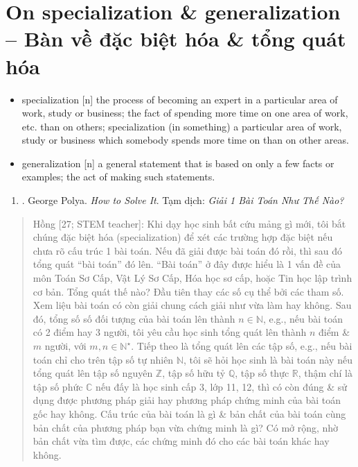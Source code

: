 \documentclass[12pt,twoside]{book}
\begin{document}
\section{On specialization \& generalization -- Bàn về đặc biệt hóa \& tổng quát hóa}

\begin{itemize}\small
	\item {\sf specialization} [n] the process of becoming an expert in a particular area of work, study or business; the fact of spending more time on one area of work, etc. than on others; specialization (in something) a particular area of work, study or business which somebody spends more time on than on other areas.
	\item {\sf generalization} [n] a general statement that is based on only a few facts or examples; the act of making such statements.
\end{itemize}

\begin{enumerate}
	\item \cite{Polya2014}. George Polya. {\it How to Solve It}. {\sf Tạm dịch}: {\it Giải 1 Bài Toán Như Thế Nào?}
\end{enumerate}

\begin{quote}
	{\sf Hồng [27; STEM teacher]}: Khi dạy học sinh bất cứu mảng gì mới, tôi bắt chúng đặc biệt hóa (specialization) để xét các trường hợp đặc biệt nếu chưa rõ cấu trúc 1 bài toán. Nếu đã giải được bài toán đó rồi, thì sau đó tổng quát ``bài toán'' đó lên. ``Bài toán'' ở đây được hiểu là 1 vấn đề của môn Toán Sơ Cấp, Vật Lý Sơ Cấp, Hóa học sơ cấp, hoặc Tin học lập trình cơ bản. Tổng quát thế nào? Đầu tiên thay các số cụ thể bởi các tham số. Xem liệu bài toán có còn giải chung cách giải như vừa làm hay không. Sau đó, tổng số số đối tượng của bài toán lên thành $n\in\mathbb{N}$, e.g., nếu bài toán có 2 điểm hay 3 người, tôi yêu cầu học sinh tổng quát lên thành $n$ điểm \& $m$ người, với $m,n\in\mathbb{N}^\star$. Tiếp theo là tổng quát lên các tập số, e.g., nếu bài toán chỉ cho trên tập số tự nhiên $\mathbb{N}$, tôi sẽ hỏi học sinh là bài toán này nếu tổng quát lên tập số nguyên $\mathbb{Z}$, tập số hữu tỷ $\mathbb{Q}$, tập số thực $\mathbb{R}$, thậm chí là tập số phức $\mathbb{C}$ nếu đấy là học sinh cấp 3, lớp 11, 12, thì có còn đúng \& sử dụng được phương pháp giải hay phương pháp chứng minh của bài toán gốc hay không. Cấu trúc của bài toán là gì \& bản chất của bài toán cùng bản chất của phương pháp bạn vừa chứng minh là gì? Có mở rộng, nhờ bản chất vừa tìm được, các chứng minh đó cho các bài toán khác hay không.
\end{quote}
\end{document}
